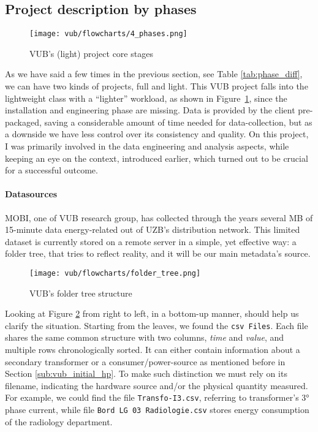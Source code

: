 \subsection{Project description by phases}
\begin{figure}[ht]
    \texttt{[image: vub/flowcharts/4\_phases.png]}
    \caption{\acs{VUB}'s (light) project core stages}
    \label{fig:vub_stages}
\end{figure}
As we have said a few times in the previous section, see Table \ref{tab:phase_diff}, we can have two kinds of projects, full and light. 
This \ac{VUB} project falls into the lightweight class with a ``lighter'' workload, as shown in Figure~\ref{fig:vub_stages}, since the installation and engineering phase are missing. 
Data is provided by the client pre-packaged, saving a considerable amount of time needed for data-collection, but as a downside we have less control over its consistency and quality.
On this project, I was primarily involved in the data engineering and analysis aspects, while keeping an eye on the context, introduced earlier, which turned out to be crucial for a successful outcome.

\paragraph{Datasources}
MOBI, one of \ac{VUB} research group, has collected through the years several MB of 15-minute data energy-related out of \ac{UZB}'s distribution network.
This limited dataset is currently stored on a remote server in a simple, yet effective way: 
a folder tree, that tries to reflect reality, and it will be our main metadata's source. 

\begin{figure}[ht]
    \texttt{[image: vub/flowcharts/folder\_tree.png]}
    \caption{\acs{VUB}'s folder tree structure}
    \label{fig:vub_folder_tree}
\end{figure}
Looking at Figure \ref{fig:vub_folder_tree} from right to left, in a bottom-up manner, should help us clarify the situation. %
Starting from the leaves, we found the \texttt{\ac{csv} Files}. Each file shares the same common structure with two columns, \textit{time} and \textit{value}, and multiple rows chronologically sorted.
It can either contain information about a secondary transformer or a consumer/power-source as mentioned before in Section \ref{sub:vub_initial_hp}. 
To make such distinction we must rely on its filename, indicating the hardware source and/or the physical quantity measured.
For example, we could find the file \texttt{Transfo-I3.csv}, referring to transformer's 3° phase current, while file \texttt{Bord LG 03 Radiologie.csv} stores energy consumption of the radiology department.

